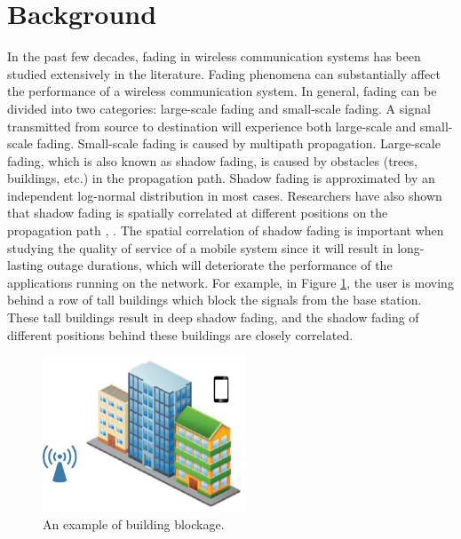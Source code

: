 \section{Background}
In the past few decades, fading in wireless communication systems has been studied extensively in the literature. Fading phenomena can substantially affect the performance of a wireless communication system. In general, fading can be divided into two categories: large-scale fading and small-scale fading. A signal transmitted from source to destination will experience both large-scale and small-scale fading. Small-scale fading is caused by multipath propagation. Large-scale fading, which is also known as shadow fading, is caused by obstacles (trees, buildings, etc.) in the propagation path. Shadow fading is approximated by an independent log-normal distribution \cite{rappaport1996wireless} in most cases. Researchers have also shown that shadow fading is spatially correlated at different positions on the propagation path \cite{gudmundson1991correlation}, \cite{zhang2008novel}. The spatial correlation of shadow fading is important when studying the quality of service of a mobile system since it will result in long-lasting outage durations, which will deteriorate the performance of the applications running on the network. For example, in Figure \ref{building}, the user is moving behind a row of tall buildings which block the signals from the base station. These tall buildings result in deep shadow fading, and the shadow fading of different positions behind these buildings are closely correlated.
\begin{figure}
\centering
\includegraphics[width=6cm]{building.eps}
\caption{An example of building blockage.}
\label{building}
\end{figure}
